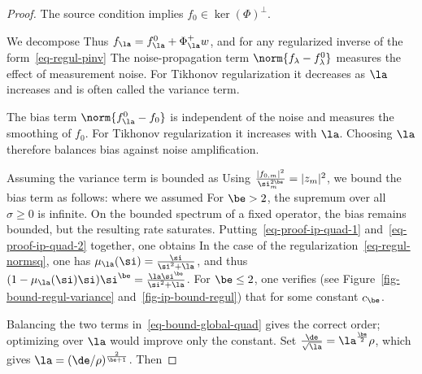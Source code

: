 \begin{proof}
	The source condition implies $f_0\in\ker(\Phi)^\bot$.
	 
	We decompose
	Thus $f_\la = f_{\la}^0 + \Phi_\la^+ w$, and for any regularized inverse of the form~\eqref{eq-regul-pinv}
    The noise-propagation term $\norm{f_\lambda-f_\lambda^0}$ measures the effect of measurement noise. For Tikhonov regularization it decreases as $\la$ increases and is often called the variance term.
	 
    The bias term $\norm{ f_{\la}^0 - f_0 }$ is independent of the noise and measures the smoothing of $f_0$. For Tikhonov regularization it increases with $\la$. Choosing $\la$ therefore balances bias against noise amplification.
	 
	Assuming 
	the variance term is bounded as
	Using $\frac{|f_{0,m}|^2}{\si_m^{2\be}} = |z_m|^2$, we bound the bias term as follows:
	where we assumed
	For $\be>2$, the supremum over all $\sigma\geq0$ is infinite. On the bounded spectrum of a fixed operator, the bias remains bounded, but the resulting rate saturates.
	Putting~\eqref{eq-proof-ip-quad-1} and~\eqref{eq-proof-ip-quad-2} together, one obtains
	In the case of the regularization~\eqref{eq-regul-normsq}, one has $\mu_\la(\si) = \frac{\si}{\si^2+\la}$, and
	thus $( 1 - \mu_\la(\si) \si )\si^{\be} = \frac{\la \si^\be}{\si^2+\la}$. 
	For $\be \leq 2$, one verifies (see Figure~\ref{fig-bound-regul-variance} and~\ref{fig-ip-bound-regul}) that
	for some constant $c_\be$.
	 
    Balancing the two terms in~\eqref{eq-bound-global-quad} gives the correct order; optimizing over $\la$ would improve only the constant. Set $\frac{\de}{\sqrt{\la}} = \la^{\frac{\be}{2}} \rho$, which gives $\la = (\de/\rho)^{\frac{2}{\be+1}}$. Then
\end{proof}



